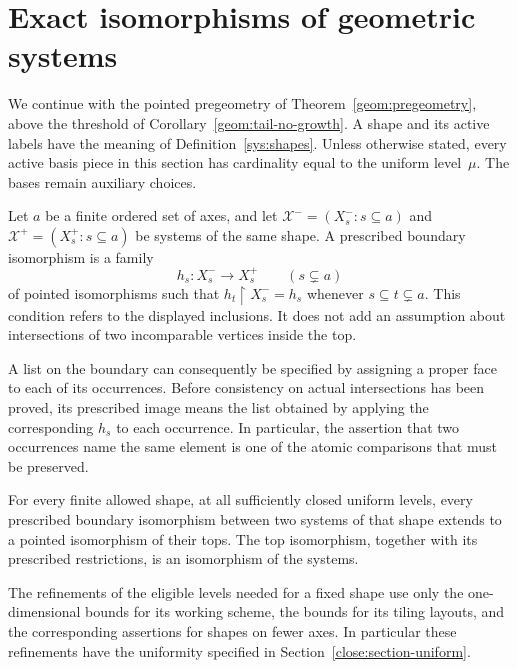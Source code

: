 \section{Exact isomorphisms of geometric systems}
\label{exact:section-boundaries}

We continue with the pointed pregeometry of
Theorem~\ref{geom:pregeometry}, above the threshold of
Corollary~\ref{geom:tail-no-growth}.  A shape and its active labels have the
meaning of Definition~\ref{sys:shapes}.  Unless otherwise stated, every
active basis piece in this section has cardinality equal to the uniform
level~$\mu$.  The bases remain auxiliary choices.

\begin{definition}
\label{exact:boundary-data}
Let $a$ be a finite ordered set of axes, and let
$\mathcal X^-=(X_s^-:s\subseteq a)$ and
$\mathcal X^+=(X_s^+:s\subseteq a)$ be systems of the same shape.
A prescribed boundary isomorphism is a family
\[
 h_s:X_s^-\longrightarrow X_s^+\qquad(s\subsetneq a)
\]
of pointed isomorphisms such that
$h_t\mathbin{\upharpoonright}X_s^-=h_s$ whenever
$s\subseteq t\subsetneq a$.  This condition refers to the displayed
inclusions.  It does not add an assumption about intersections of two
incomparable vertices inside the top.
\end{definition}

A list on the boundary can consequently be specified by assigning a
proper face to each of its occurrences.  Before consistency on actual
intersections has been proved, its prescribed image means the list
obtained by applying the corresponding $h_s$ to each occurrence.
In particular, the assertion that two occurrences name the same element
is one of the atomic comparisons that must be preserved.

\begin{theorem}
\label{exact:geometric-boundary}
For every finite allowed shape, at all sufficiently closed uniform
levels, every prescribed boundary isomorphism between two systems of
that shape extends to a pointed isomorphism of their tops.  The top
isomorphism, together with its prescribed restrictions, is an
isomorphism of the systems.

The refinements of the eligible levels needed for a fixed shape use
only the one-dimensional bounds for its working scheme, the bounds
for its tiling layouts, and the corresponding assertions for shapes
on fewer axes.  In particular these refinements have the uniformity
specified in Section~\ref{close:section-uniform}.
\end{theorem}

